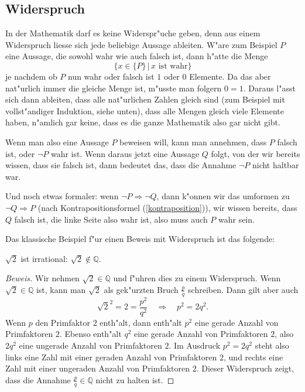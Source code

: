 \subsection{Widerspruch\label{widerspruchsbeweis}}
In der Mathematik darf es keine Widerspr"uche geben, denn aus einem
Widerspruch liesse sich jede beliebige Aussage ableiten. W"are zum
Beispiel $P$ eine Aussage, die sowohl wahr wie auch falsch ist,
dann h"atte die Menge
\[
\{x\in\{P\}\,|\, \text{$x$ ist wahr}\}
\]
je nachdem ob $P$ nun wahr oder falsch ist $1$ oder $0$ Elemente.
Da das aber nat"urlich immer die gleiche Menge ist, m"usste man
folgern $0=1$. Daraus l"asst sich dann ableiten, dass alle nat"urlichen
Zahlen gleich sind (zum Beispiel mit vollst"andiger Induktion, siehe
unten), dass alle Mengen gleich viele Elemente haben, n"amlich gar
keine, dass es die ganze Mathematik also gar nicht gibt.

Wenn man also eine Aussage $P$ beweisen will, kann man annehmen,
dass $P$ falsch ist, oder $\neg P$ wahr ist. Wenn daraus jetzt
eine Aussage $Q$ folgt, von der wir bereits wissen, dass sie falsch
ist, dann bedeutet das, dass die Annahme $\neg P$ nicht haltbar
war.

Und noch etwas formaler: wenn $\neg P\Rightarrow \neg Q$, dann k"onnen
wir das umformen zu $\neg Q\Rightarrow P$ (nach Kontrapositionsformel
(\ref{kontraposition})), wir wissen bereits, dass
$Q$ falsch ist, die linke Seite also wahr ist, also muss auch $P$
wahr sein.

Das klassische Beispiel f"ur einen Beweis mit Widerspruch ist das 
folgende:
\begin{satz}$\sqrt{2}$ ist irrational: $\sqrt{2}\not\in\mathbb Q$.
\end{satz}
\begin{proof}[Beweis]
Wir nehmen $\sqrt{2}\in\mathbb Q$ und f"uhren dies zu einem
Widerspruch. Wenn $\sqrt{2}\in\mathbb Q$ ist, kann man $\sqrt{2}$
als gek"urzten Bruch $\frac{p}{q}$ schreiben. Dann gilt aber
auch
\[
\sqrt{2}^2=2=\frac{p^2}{q^2}\quad\Rightarrow\quad p^2=2q^2.
\]
Wenn $p$ den Primfaktor $2$ enth"alt, dann enth"alt $p^2$
eine gerade Anzahl von Primfaktoren $2$. Ebenso enth"alt
$q^2$ eine gerade Anzahl von Primfaktoren $2$, also $2q^2$
eine ungerade Anzahl von Primfaktoren $2$.
Im Ausdruck $p^2=2q^2$ steht also links eine Zahl mit einer
geraden Anzahl von Primfaktoren $2$, und rechts eine Zahl mit
einer ungeraden Anzahl von Primfaktoren $2$.
Dieser Widerspruch zeigt, dass die
Annahme $\frac{p}q\in\mathbb Q$ nicht zu halten ist.
\end{proof}

